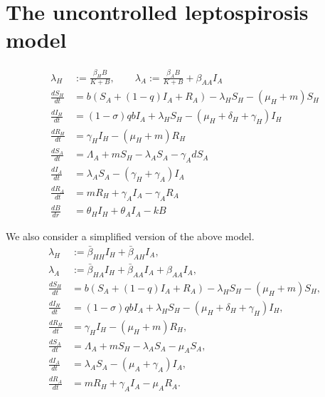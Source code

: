 \documentclass[3p,sort&compress]{elsarticle}
\DeclareRobustCommand{\1}[1]{\ensuremath \mathbbm{1}_{\{#1\}}}
\begin{document}
\section{The uncontrolled leptospirosis model}
      \begin{equation}
        \begin{aligned}
                \lambda_H &:= \frac{\beta_H B}{K + B}, \qquad
                \lambda_A := \frac{\beta_A B}{K + B} + \beta_{AA} I_A
                \\
                \frac{d S_H}{dt} &=
                    b (S_A + (1 - q) I_A + R_A)
                    - \lambda_H S_H - (\mu_H + m) S_H 
                \\
                \frac{d I_H}{dt} &=
                    (1 - \sigma)   q   b   I_A
                    + \lambda_H S_H - (\mu_H + \delta_H + \gamma_H)I_H
                \\
                \frac{d R_H}{dt} &=
                    \gamma_H I_H - (\mu_H + m) R_H
                \\
                \frac{dS_A}{dt} &=
                    \Lambda_A + m S_H - \lambda_A S_A - \gamma_A dS_A
                \\
                \frac{d I_A}{dt} &=
                    \lambda_A S_A - (\gamma_H + \gamma_A)   I_A
                \\
                \frac{dR_A}{dt} &=
                    m R_H + \gamma_A I_A - \gamma_A R_A
                \\
                \frac{dB}{dr} &=
                    \theta_H I_H + \theta_A I_A - k B
           \end{aligned}
      \end{equation}

We also consider a simplified version of the above model.
    \begin{equation}\label{main_system}
        \begin{aligned}
            \lambda_H &:= \bar{\beta}_{HH} I_H + \bar{\beta}_{AH} I_A,
            \\
            \lambda_A &:= \bar{\beta}_{HA} I_H + \bar{\beta}_{AA} I_A
                + \beta_{AA} I_A,
        \\
            \frac{d S_H}{dt} &=
            b (S_A + (1 - q) I_A + R_A)
            -\lambda_H S_H - (\mu_H + m) S_H,
        \\
            \frac{d I_H}{dt} &=
            (1 - \sigma)  q  b  I_A
            + \lambda_H S_H - (\mu_H + \delta_{H} + \gamma_H)I_H,
        \\
            \frac{d R_H}{dt} &=
            \gamma_H I_H - (\mu_H + m) R_H,
        \\
            \frac{dS_A}{dt} &=
            \Lambda_A + m S_H - \lambda_A S_A - \mu_A S_A,
        \\
            \frac{d I_A}{dt} &=
            \lambda_A S_A - (\mu_A + \gamma_A)   I_A,
        \\
            \frac{dR_A}{dt} &=
            m R_H + \gamma_A I_A - \mu_A R_A.
    \end{aligned}
\end{equation}
\end{document}
